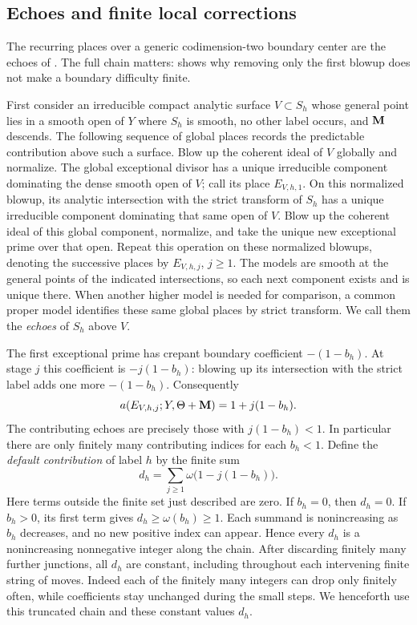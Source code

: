 \subsection{Echoes and finite local corrections}

The recurring places over a generic codimension-two boundary center are
the echoes of \cite[Example~1.4, Lemma~1.5, and Definition~2.3]{AlexeevHaconKawamata2007}.
The full chain matters: \cite[Example~2.1]{Fujino2005Addendum} shows why
removing only the first blowup does not make a boundary difficulty finite.

First consider an irreducible compact analytic surface \(V\subset S_h\)
whose general point lies in a smooth open of \(Y\) where \(S_h\) is smooth,
no other label occurs, and \(\mathbf{M}\) descends.  The following sequence of
global places records the predictable contribution above such a surface.
Blow up the coherent ideal of \(V\) globally and normalize.  The global
exceptional divisor has a unique irreducible component dominating the dense
smooth open of \(V\); call its place \(E_{V,h,1}\).  On this normalized
blowup, its analytic intersection with the strict transform of \(S_h\)
has a unique irreducible component dominating that same open of \(V\).
Blow up the coherent ideal of this global component, normalize, and take
the unique new exceptional prime over that open.  Repeat this operation on
these normalized blowups, denoting the successive places by
\(E_{V,h,j}\), \(j\geq1\).  The models are smooth at the general points
of the indicated intersections, so each next component exists and is
unique there.  When another higher model is needed for comparison, a common
proper model identifies these same global places by strict transform.  We
call them the \emph{echoes} of \(S_h\) above \(V\).

The first exceptional prime has crepant boundary coefficient
\(-(1-b_h)\).  At stage \(j\) this coefficient is \(-j(1-b_h)\): blowing
up its intersection with the strict label adds one more \(-(1-b_h)\).
Consequently
\begin{equation}\label{eq:echo-discrepancy}
 a(E_{V,h,j};Y,\Theta+\mathbf{M})=1+j(1-b_h).
\end{equation}
The contributing echoes are precisely those with \(j(1-b_h)<1\).  In
particular there are only finitely many contributing indices for each
\(b_h<1\).  Define the \emph{default contribution} of label \(h\) by the finite sum
\begin{equation}\label{eq:echo-default}
 d_h=\sum_{j\geq1}\omega\bigl(1-j(1-b_h)\bigr).
\end{equation}
Here terms outside the finite set just described are zero.  If \(b_h=0\),
then \(d_h=0\).  If \(b_h>0\), its first term gives
\(d_h\geq\omega(b_h)\geq1\).  Each summand is nonincreasing as \(b_h\)
decreases, and no new positive index can appear.  Hence every \(d_h\) is a
nonincreasing nonnegative integer along the chain.  After discarding
finitely many further junctions, all \(d_h\) are constant, including
throughout each intervening finite string of moves.  Indeed each of the
finitely many integers can drop only finitely often, while coefficients
stay unchanged during the small steps.  We henceforth use this truncated
chain and these constant values \(d_h\).

